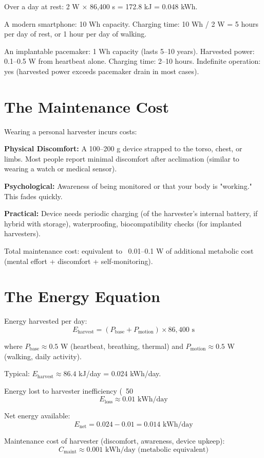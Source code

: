 \documentclass[12pt]{article}
\begin{document}
Over a day at rest: 2 W × 86,400 s = 172.8 kJ = 0.048 kWh.

A modern smartphone: 10 Wh capacity. Charging time: 10 Wh / 2 W = 5 hours per day of rest, or 1 hour per day of walking.

An implantable pacemaker: 1 Wh capacity (lasts 5–10 years). Harvested power: 0.1–0.5 W from heartbeat alone. Charging time: 2–10 hours. Indefinite operation: yes (harvested power exceeds pacemaker drain in most cases).

\section{The Maintenance Cost}

Wearing a personal harvester incurs costs:

\textbf{Physical Discomfort:} A 100–200 g device strapped to the torso, chest, or limbs. Most people report minimal discomfort after acclimation (similar to wearing a watch or medical sensor).

\textbf{Psychological:} Awareness of being monitored or that your body is "working." This fades quickly.

\textbf{Practical:} Device needs periodic charging (of the harvester's internal battery, if hybrid with storage), waterproofing, biocompatibility checks (for implanted harvesters).

Total maintenance cost: equivalent to ~0.01–0.1 W of additional metabolic cost (mental effort + discomfort + self-monitoring).

\section{The Energy Equation}

Energy harvested per day:
\[
E_{\text{harvest}} = (P_{\text{base}} + P_{\text{motion}}) \times 86,400 \text{ s}
\]

where $P_{\text{base}} \approx 0.5$ W (heartbeat, breathing, thermal) and $P_{\text{motion}} \approx 0.5$ W (walking, daily activity).

Typical: $E_{\text{harvest}} \approx 86.4$ kJ/day = 0.024 kWh/day.

Energy lost to harvester inefficiency (~50%
\[
E_{\text{loss}} \approx 0.01 \text{ kWh/day}
\]

Net energy available:
\[
E_{\text{net}} = 0.024 - 0.01 = 0.014 \text{ kWh/day}
\]

Maintenance cost of harvester (discomfort, awareness, device upkeep):
\[
C_{\text{maint}} \approx 0.001 \text{ kWh/day (metabolic equivalent)}
\]
\end{document}
